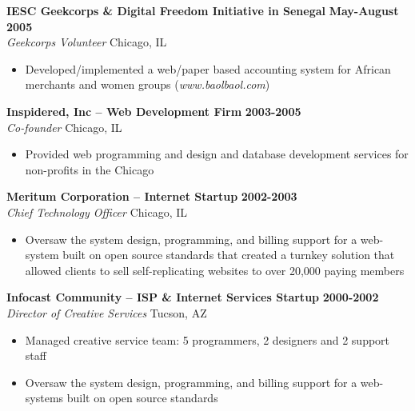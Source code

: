 \documentclass{res}
\begin{document}
\begin{resume}
\textbf{IESC Geekcorps \& Digital Freedom Initiative in Senegal} \hfill \textbf{May-August 2005} \\
\emph{Geekcorps Volunteer} \hfill Chicago, IL
 \begin{itemize} \itemsep -2pt
  \item  Developed/implemented a web/paper based accounting system for African merchants and women groups (\emph{www.baolbaol.com})
\end{itemize} \vspace{-6pt}

\textbf{Inspidered, Inc -- Web Development Firm} \hfill \textbf{2003-2005} \\
\emph{Co-founder} \hfill Chicago, IL
 \begin{itemize} \itemsep -2pt
  \item  Provided web programming and design and database development services for non-profits in the Chicago 
 \end{itemize} \vspace{-6pt}
 
\textbf{Meritum Corporation -- Internet Startup} \hfill \textbf{2002-2003} \\
\emph{Chief Technology Officer} \hfill Chicago, IL
 \begin{itemize} \itemsep -2pt
  \item Oversaw the system design, programming, and billing support for a web-system built on open source standards that created a 
	turnkey solution that allowed clients to sell self-replicating websites to over 20,000 paying members
\end{itemize} \vspace{-6pt}

\textbf{Infocast Community -- ISP \& Internet Services Startup} \hfill \textbf{2000-2002} \\
\emph{Director of Creative Services} \hfill Tucson, AZ
 \begin{itemize} \itemsep -2pt
  \item Managed creative service team: 5 programmers, 2 designers and 2 support staff
  \item Oversaw the system design, programming, and billing support for a web-systems built on open source standards
\end{itemize} \vspace{-6pt}


\end{resume}
\end{document}
